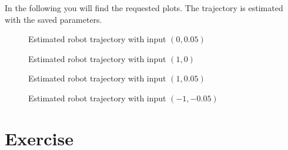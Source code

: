 \documentclass[conference]{IEEEtran}
\begin{document}
\begin{compactenum}[a)]
\item In the following you will find the requested plots. The trajectory is estimated with the saved parameters.
\begin{figure}[h!]
  	\centering
    \scalebox{.6}{}
    \caption{Estimated robot trajectory with input $(0,0.05)$}
    \label{fig:robotLR1}
\end{figure}
\begin{figure}[h!]
  	\centering
    \scalebox{.6}{}
    \caption{Estimated robot trajectory with input $(1,0)$}
    \label{fig:robotLR2}
\end{figure}
\begin{figure}[h!]
  	\centering
    \scalebox{.6}{}
    \caption{Estimated robot trajectory with input $(1,0.05)$}
    \label{fig:robotLR3}
\end{figure}
\begin{figure}[h!]
  	\centering
    \scalebox{.6}{}
    \caption{Estimated robot trajectory with input $(-1,-0.05)$}
    \label{fig:robotLR4}
\end{figure}
\end{compactenum}

\newpage
\section{Exercise}
\end{document}

